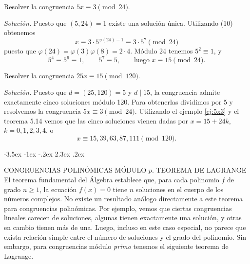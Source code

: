 \documentclass[12pt,a4paper]{book}
\makeatletter
\renewcommand\section{\@startsection{section}{1}{\z@}%
  {-3.5ex \@plus -1ex \@minus -.2ex}%
  {2.3ex \@plus .2ex}%
  {\normalfont\Large\bfseries\raggedright}}
\makeatother
\begin{document}
    \begin{ejemplo}
        Resolver la congruencia $5x\equiv3\pmod{24}$.

        \textit{Solución.} Puesto que $(5,24)=1$ existe una solución única. Utilizando (10)
        obtenemos
        \begin{equation*}
            x\equiv3\cdot5^{\varphi(24)-1}\equiv3\cdot5^{7}\pmod{24}
        \end{equation*}
        puesto que $\varphi(24)=\varphi(3)\varphi(8)=2\cdot4$. Módulo 24 tenemos
        $5^{2}\equiv1$, y
        \begin{equation*}
            5^{4}\equiv5^{6}\equiv1,\qquad5^{7}\equiv5,\qquad\text{luego }x\equiv15\pmod{24}.
        \end{equation*}
        \label{ej:5x3}
    \end{ejemplo}

    \begin{ejemplo}
        Resolver la congruencia $25x\equiv15\pmod{120}$.

        \textit{Solución.} Puesto que $d=(25,120)=5$ y $d\mid15$, la congruencia admite
        exactamente cinco soluciones módulo 120. Para obtenerlas dividimos por 5 y
        resolvemos la congruencia $5x\equiv3\pmod{24}$. Utilizando el ejemplo
        \ref{ej:5x3} y el teorema 5.14 vemos que las cinco soluciones vienen dadas por
        $x=15+24k$, $k=0,1,2,3,4$, o
        \begin{equation*}
            x\equiv15,39,63,87,111\pmod{120}.
        \end{equation*}
    \end{ejemplo}

    \section{CONGRUENCIAS POLINÓMICAS MÓDULO \texorpdfstring{$p$}{p}. TEOREMA DE LAGRANGE}
    El teorema fundamental del Álgebra establece que, para cada polinomio $f$ de grado
    $n\geq1$, la ecuación $f(x)=0$ tiene $n$ soluciones en el cuerpo de los números
    complejos. No existe un resultado análogo directamente a este teorema para
    congruencias polinómicas. Por ejemplo, vemos que ciertas congruencias lineales
    carecen de soluciones, algunas tienen exactamente una solución, y otras en cambio
    tienen más de una. Luego, incluso en este caso especial, no parece que exista
    relación simple entre el número de soluciones y el grado del polinomio. Sin embargo,
    para congruencias módulo \textit{primo} tenemos el siguiente teorema de Lagrange.
\end{document}
